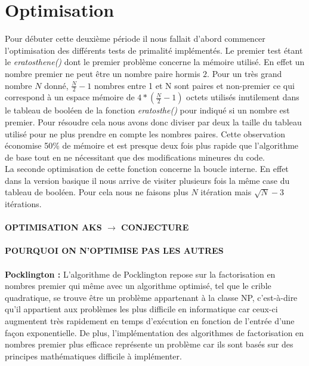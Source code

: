 		
	\section{Optimisation}
	Pour débuter cette deuxième période il nous fallait d'abord commencer l'optimisation des différents tests de primalité implémentés. Le premier test étant le \textit{eratosthene()} dont le premier problème concerne la mémoire utilisé. En effet un nombre premier ne peut être un nombre paire hormis $2$. Pour un très grand nombre $N$ donné, $\frac{N}{2}-1$ nombres entre 1 et N sont paires et non-premier ce qui correspond à un espace mémoire de $4*(\frac{N}{2}-1)$ octets utilisés inutilement dans le tableau de booléen de la fonction \textit{eratosthe()} pour indiqué si un nombre est premier. Pour résoudre cela nous avons donc diviser par deux la taille du tableau utilisé pour ne plus prendre en compte les nombres paires. Cette observation économise 50\% de mémoire et est presque deux fois plus rapide que l'algorithme de base tout en ne nécessitant que des modifications mineures du code.\\
La seconde optimisation de cette fonction concerne la boucle interne. En effet dans la version basique il nous arrive de visiter plusieurs fois la même case du tableau de booléen. Pour cela nous ne faisons plus $N$ itération mais $\sqrt{N}-3$ itérations.

	\paragraph{} \textbf{OPTIMISATION AKS $\rightarrow$ CONJECTURE}
	
	\paragraph{} \textbf{POURQUOI ON N'OPTIMISE PAS LES AUTRES}
	\paragraph{} \textbf{Pocklington : }
	L'algorithme de Pocklington repose sur la factorisation en nombres premier qui même avec un algorithme optimisé, tel que le crible quadratique, se trouve être un problème appartenant à la classe NP, c'est-à-dire qu'il appartient aux problèmes les plus difficile en informatique car ceux-ci augmentent très rapidement en temps d'exécution en fonction de l'entrée d'une façon exponentielle. De plus, l'implémentation des algorithmes de factorisation en nombres premier plus efficace représente un problème car ils sont basés sur des principes mathématiques difficile à implémenter.
	

